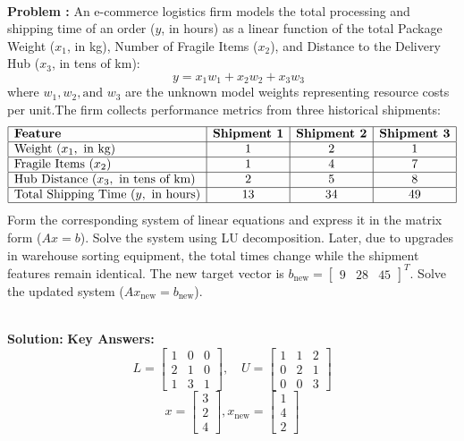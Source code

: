\documentclass[DIV=20,oneside]{scrartcl}
\newcounter{problem}
\newcommand{\problem}{
	\stepcounter{problem}
	\noindent\textbf{\\Problem \theproblem: }
}
\newcommand{\solution}{
	\noindent\textbf{\\Solution: }
}
\begin{document}
\problem An e-commerce logistics firm models the total processing and shipping time of an order ($y$, in hours) as a linear function of the total Package Weight ($x_1$, in kg), Number of Fragile Items ($x_2$), and Distance to the Delivery Hub ($x_3$, in tens of km):$$\quad y = x_1w_1 + x_2w_2 + x_3w_3$$where $w_1, w_2, \text{and } w_3$ are the unknown model weights representing resource costs per unit.The firm collects performance metrics from three historical shipments:$$\begin{array}{|l|c|c|c|}
	\hline
	\textbf{Feature} & \textbf{Shipment 1} & \textbf{Shipment 2} & \textbf{Shipment 3} \\
	\hline
	\text{Weight } (x_1, \text{ in kg}) & 1 & 2 & 1 \\
	\hline
	\text{Fragile Items } (x_2) & 1 & 4 & 7 \\
	\hline
	\text{Hub Distance } (x_3, \text{ in tens of km}) & 2 & 5 & 8 \\
	\hline
	\text{Total Shipping Time } (y, \text{ in hours}) & 13 & 34 & 49 \\
	\hline
\end{array}$$Form the corresponding system of linear equations and express it in the matrix form ($Ax=b$). Solve the system using LU decomposition. Later, due to upgrades in warehouse sorting equipment, the total times change while the shipment features remain identical. The new target vector is $b_{\text{new}} = \begin{bmatrix} 9 & 28 & 45 \end{bmatrix}^T$. Solve the updated system ($Ax_{\text{new}}=b_{\text{new}}$).
\solution \textbf{Key Answers:} $$L = \begin{bmatrix} 1 & 0 & 0 \\ 2 & 1 & 0 \\ 1 & 3 & 1 \end{bmatrix}, \quad U = \begin{bmatrix} 1 & 1 & 2 \\ 0 & 2 & 1 \\ 0 & 0 & 3 \end{bmatrix}$$
$$x = \begin{bmatrix} 3 \\ 2 \\ 4 \end{bmatrix}, x_{\text{new}} = \begin{bmatrix} 1 \\ 4 \\ 2 \end{bmatrix}$$
\end{document}
